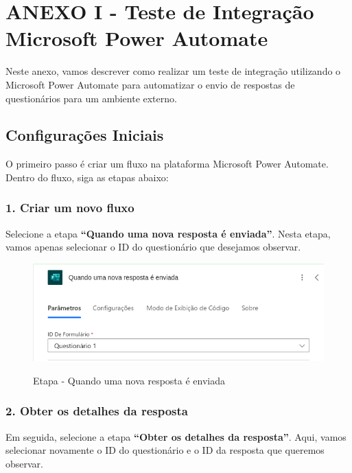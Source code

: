 \chapter*{ANEXO I - Teste de Integração Microsoft Power Automate}
\label{anexoITIMPA}

Neste anexo, vamos descrever como realizar um teste de integração utilizando o Microsoft Power Automate para automatizar o envio de respostas de questionários para um ambiente externo.

\section*{Configurações Iniciais}

O primeiro passo é criar um fluxo na plataforma Microsoft Power Automate. Dentro do fluxo, siga as etapas abaixo:

\subsection*{1. Criar um novo fluxo}

Selecione a etapa \textbf{``Quando uma nova resposta é enviada''}.
Nesta etapa, vamos apenas selecionar o ID do questionário que desejamos observar.

\begin{figure}[H]
    \centering
    \caption{Etapa - Quando uma nova resposta é enviada}
    \includegraphics[width=1\textwidth]{figuras/mpa_new_answer.png}
    \label{fig:report_questions}
\end{figure}

\subsection*{2. Obter os detalhes da resposta}

Em seguida, selecione a etapa \textbf{``Obter os detalhes da resposta''}.
Aqui, vamos selecionar novamente o ID do questionário e o ID da resposta que queremos observar.

